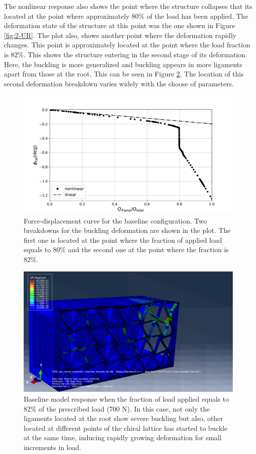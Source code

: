   The nonlinear response also shows the point where the structure collapses that its located at the point where approximately $80\%$ of the load has been applied. The deformation state of the structure at this point was the one shown in Figure \ref{fig:2-UR}. The plot also, shows another point where the deformation rapidly changes. This point is approximately located at the point where the load fraction is $82\%$. This shows the structure entering in the second stage of its deformation. Here, the buckling is more generalized and buckling appears in more ligaments apart from those at the root. This can be seen in Figure \ref{fig:3-UR}. The location of this second deformation breakdown varies widely with the choose of parameters.

  \begin{figure}[!htpb] %
    \centering
    \includegraphics[width=0.8 \textwidth]{../figures/result-sim/forceDisplacement-far}
    \caption[Force-displacement curve for the baseline configuration]{Force-displacement curve for the baseline configuration. Two breakdowns for the buckling deformation are shown in the plot. The first one is located at the point where the fraction of applied load equals to $80\%$ and the second one at the point where the fraction is $82\%$.}\label{fig:forceDisplacement-far}
  \end{figure}

  \begin{figure}[!htpb] %
    \centering
    \includegraphics[width=0.8 \textwidth]{../figures/result-sim/3-UR}
    \caption[Baseline model response when the fraction of load applied equals to 82\% of the prescribed load (700 N)]{Baseline model response when the fraction of load applied equals to 82\% of the prescribed load (700 N). In this case, not only the ligaments located at the root show severe buckling but also, other located at different points of the chiral lattice has started to buckle at the same time, inducing rapidly growing deformation for small increments in load.}\label{fig:3-UR}
  \end{figure}

